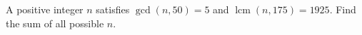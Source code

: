 A positive integer $ n $ satisfies $\gcd(n,50)=5 $ and $\operatorname{lcm}(n,175)=1925 $. Find the sum of all possible $ n $.
